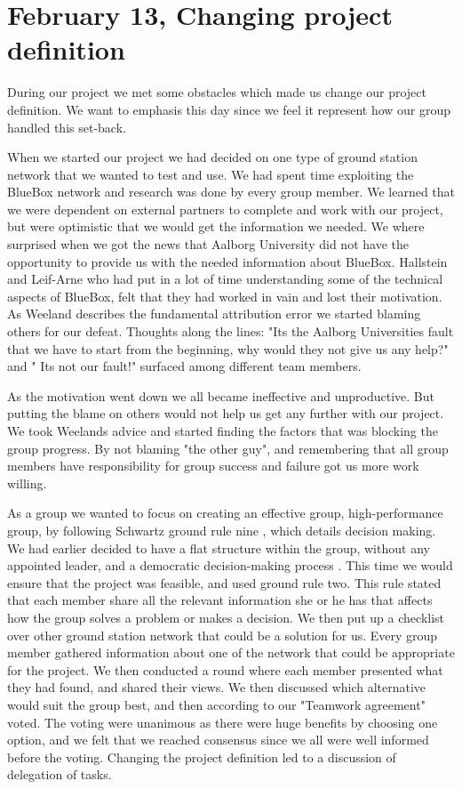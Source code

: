 \section{February 13, Changing project definition}

During our project we met some obstacles which made us change our project definition. We want to emphasis this day since we feel it represent how our group handled this set-back.

When we started our project we had decided on one type of ground station network that we wanted to test and use. We had spent time exploiting the BlueBox network and research was done by every group member. We learned that we were dependent on external partners to complete and work with our project, but were optimistic that we would get the information we needed. We where surprised when we got the news that Aalborg University did not have the opportunity to provide us with the needed information about BlueBox. Hallstein and Leif-Arne who had put in a lot of time understanding some of the technical aspects of BlueBox, felt that they had worked in vain and lost their motivation. As Weeland describes the fundamental attribution error \cite{EffectiveTeamMembers} we started blaming others for our defeat. Thoughts along the lines: "Its the Aalborg Universities fault that we have to start from the beginning, why would they not give us any help?" and " Its not our fault!" surfaced among different team members. 

As the motivation went down we all became ineffective and unproductive. But putting the blame on others would not help us get any further with our project. We took Weelands advice and started finding the factors that was blocking the group progress. By not blaming "the other guy", and remembering that all group members have responsibility for group success and failure got us more work willing. 

As a group we wanted to focus on creating an effective group, high-performance group, by following Schwartz ground rule nine \cite{EffectiveGroups}, which details decision making. We had earlier decided to have a flat structure within the group, without any appointed leader, and a democratic decision-making process \cite{EffectiveGroups}. This time we would ensure that the project was feasible, and used ground rule two. This rule stated that each member share all the relevant information she or he has that affects how the group solves a problem or makes a decision. We then put up a checklist over other ground station network that could be a solution for us. Every group member gathered information about one of the network that could be appropriate for the project. We then conducted a round where each member presented what they had found, and shared their views. We then discussed which alternative would suit the group best, and then according to our "Teamwork agreement" voted. The voting were unanimous as there were huge benefits by choosing one option, and we felt that we reached consensus since we all were well informed before the voting. Changing the project definition led to a discussion of delegation of tasks. 


